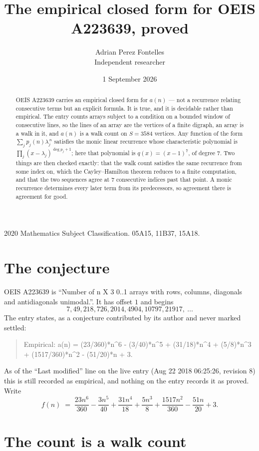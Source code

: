 \documentclass[11pt,a4paper]{article}
\title{The empirical closed form for OEIS A223639, proved}
\author{Adrian Perez Fontelles\\ \small Independent researcher}
\date{1 September 2026}
\theoremstyle{plain}
\theoremstyle{definition}
\begin{document}
\maketitle

\begin{abstract}
OEIS A223639 carries an empirical closed form for $a(n)$ --- not a recurrence relating
consecutive terms but an explicit formula. It is true, and it is decidable rather than
empirical. The entry counts arrays subject to a condition on a bounded window of consecutive lines, so the lines of an array are the
vertices of a finite digraph, an array is a walk in it, and $a(n)$ is a walk count on
$S=3584$ vertices. Any function of the form $\sum_j p_j(n)\lambda_j^{\,n}$ satisfies the
monic linear recurrence whose characteristic polynomial is
$\prod_j(x-\lambda_j)^{\deg p_j+1}$; here that polynomial is $q(x)=(x-1)^{7}$, of degree
$7$. Two things are then checked exactly: that the walk count satisfies the same
recurrence from some index on, which the Cayley--Hamilton theorem reduces to a finite
computation, and that the two sequences agree at $7$ consecutive indices past that
point. A monic recurrence determines every later term from its predecessors, so agreement
there is agreement for good.
\end{abstract}

\noindent\small 2020 Mathematics Subject Classification. 05A15, 11B37, 15A18.\normalsize

\section{The conjecture}

OEIS A223639 is ``Number of n X 3 0..1 arrays with rows, columns, diagonals and antidiagonals unimodal.''. It has offset $1$ and begins
\[
7, 49, 218, 726, 2014, 4904, 10797, 21917,\ \dots
\]
The entry states, as a conjecture contributed by its author and never marked settled:
\begin{quote}
Empirical: a(n) = (23/360)*n\^{}6 - (3/40)*n\^{}5 + (31/18)*n\^{}4 + (5/8)*n\^{}3 + (1517/360)*n\^{}2 - (51/20)*n + 3.
\end{quote}
As of the ``Last modified'' line on the live entry (Aug 22 2018 06:25:26, revision 8) this is still
recorded as empirical, and nothing on the entry records it as proved. Write
\[
f(n)\;=\;\frac{23 n^{6}}{360} - \frac{3 n^{5}}{40} + \frac{31 n^{4}}{18} + \frac{5 n^{3}}{8} + \frac{1517 n^{2}}{360} - \frac{51 n}{20} + 3.
\]

\section{The count is a walk count}
\end{document}
